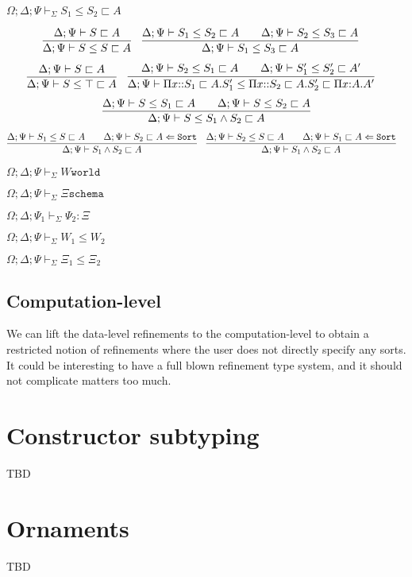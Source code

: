 \documentclass[letterpaper, 11pt]{article}
\newcommand{\Lar}{\Leftarrow}
\newcommand{\Sort}{\texttt{Sort}}
\newcommand{\world}{\texttt{world}}
\newcommand{\schema}{\texttt{schema}}
\begin{document}
    $\boxed{\Omega; \Delta; \Psi \vdash_\Sigma S_1 \leq S_2 \sqsubset A }$
    
    \begin{align*}
      & \infer{\Delta; \Psi \vdash S \leq S \sqsubset A}{\Delta; \Psi \vdash S \sqsubset A} &
      & \infer{\Delta; \Psi \vdash S_1 \leq S_3 \sqsubset A}
        {
          \Delta; \Psi \vdash S_1 \leq S_2 \sqsubset A
          &&
          \Delta; \Psi \vdash S_2 \leq S_3 \sqsubset A
        }
    \end{align*}
    \begin{align*}
      & \infer{\Delta; \Psi \vdash S \leq \top \sqsubset A}{\Delta; \Psi \vdash S \sqsubset A} &
      & \infer{\Delta; \Psi \vdash \Pi x{::}S_1 \sqsubset A. S_1' \leq \Pi x{::}S_2 \sqsubset A. S_2' \sqsubset \Pi x{:}A.A'}
        {
          \Delta; \Psi \vdash S_2 \leq S_1 \sqsubset A
          &&
          \Delta; \Psi \vdash S_1' \leq S_2' \sqsubset A'
        }
    \end{align*}
    \begin{align*}
      \infer{\Delta; \Psi \vdash S \leq S_1 \land S_2 \sqsubset A}
            { 
              \Delta; \Psi \vdash S \leq S_1 \sqsubset A
              &&
              \Delta; \Psi \vdash S \leq S_2 \sqsubset A
            }
    \end{align*}
    \begin{align*}
      & \infer{\Delta; \Psi \vdash S_1 \land S_2 \sqsubset A}
        { 
          \Delta; \Psi \vdash S_1 \leq S \sqsubset A
          &&
          \Delta; \Psi \vdash S_2 \sqsubset A \Lar \Sort
        } &
      & \infer{\Delta; \Psi \vdash S_1 \land S_2 \sqsubset A}
        { 
          \Delta; \Psi \vdash S_2 \leq S \sqsubset A
          &&
          \Delta; \Psi \vdash S_1 \sqsubset A \Lar \Sort
        }
    \end{align*}

    $\boxed{\Omega; \Delta; \Psi \vdash_\Sigma W \world}$

    $\boxed{\Omega; \Delta; \Psi \vdash_\Sigma \Xi \schema}$

    $\boxed{\Omega; \Delta; \Psi_1 \vdash_\Sigma \Psi_2 : \Xi}$

    $\boxed{\Omega; \Delta; \Psi \vdash_\Sigma W_1 \leq W_2}$

    $\boxed{\Omega; \Delta; \Psi \vdash_\Sigma \Xi_1 \leq \Xi_2}$

    \subsection{Computation-level}
    We can lift the data-level refinements to the computation-level to obtain a restricted notion of refinements where the user does not directly
    specify any sorts.  It could be interesting to have a full blown refinement type system, and it should not complicate matters too much.

    \section{Constructor subtyping}
    TBD

    \section{Ornaments}
    TBD

    
        
\end{document}

